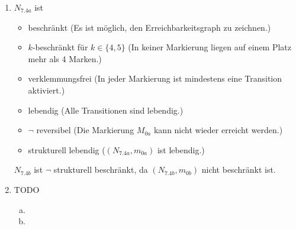 \documentclass[a4paper]{scrartcl}
\begin{document}
\begin{enumerate}
    \item
        $N_{7.4a}$ ist
        \begin{itemize}
            \item beschränkt (Es ist möglich, den Erreichbarkeitsgraph zu
                zeichnen.)
            \item $k$-beschränkt für $k \in \{4,5\}$ (In keiner Markierung
                liegen auf einem Platz mehr als 4 Marken.)
            \item verklemmungsfrei (In jeder Markierung ist mindestens eine
                Transition aktiviert.)
            \item lebendig (Alle Transitionen sind lebendig.)
            \item $\lnot$ reversibel (Die Markierung $M_{0a}$ kann nicht wieder
                erreicht werden.)
            \item strukturell lebendig ($(N_{7.4a}, m_{0a})$ ist lebendig.)
        \end{itemize}

        $N_{7.4b}$ ist $\lnot$ strukturell beschränkt, da $(N_{7.4b}, m_{0b})$
        nicht beschränkt ist.

    \item TODO
        \begin{enumerate}[(a)]
            \item

            \item

        \end{enumerate}

\end{enumerate}
\end{document}
